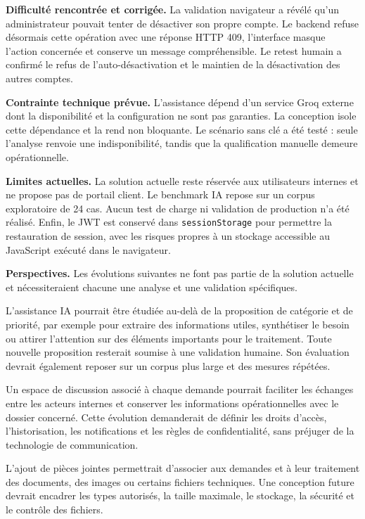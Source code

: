 \textbf{Difficulté rencontrée et corrigée.} La validation navigateur a révélé qu'un administrateur pouvait tenter de désactiver son propre compte. Le backend refuse désormais cette opération avec une réponse HTTP 409, l'interface masque l'action concernée et conserve un message compréhensible. Le retest humain a confirmé le refus de l'auto-désactivation et le maintien de la désactivation des autres comptes.

\textbf{Contrainte technique prévue.} L'assistance dépend d'un service Groq externe dont la disponibilité et la configuration ne sont pas garanties. La conception isole cette dépendance et la rend non bloquante. Le scénario sans clé a été testé : seule l'analyse renvoie une indisponibilité, tandis que la qualification manuelle demeure opérationnelle.

\textbf{Limites actuelles.} La solution actuelle reste réservée aux utilisateurs internes et ne propose pas de portail client. Le benchmark IA repose sur un corpus exploratoire de 24 cas. Aucun test de charge ni validation de production n'a été réalisé. Enfin, le JWT est conservé dans \texttt{sessionStorage} pour permettre la restauration de session, avec les risques propres à un stockage accessible au JavaScript exécuté dans le navigateur.

\textbf{Perspectives.} Les évolutions suivantes ne font pas partie de la solution actuelle et nécessiteraient chacune une analyse et une validation spécifiques.

L'assistance IA pourrait être étudiée au-delà de la proposition de catégorie et de priorité, par exemple pour extraire des informations utiles, synthétiser le besoin ou attirer l'attention sur des éléments importants pour le traitement. Toute nouvelle proposition resterait soumise à une validation humaine. Son évaluation devrait également reposer sur un corpus plus large et des mesures répétées.

Un espace de discussion associé à chaque demande pourrait faciliter les échanges entre les acteurs internes et conserver les informations opérationnelles avec le dossier concerné. Cette évolution demanderait de définir les droits d'accès, l'historisation, les notifications et les règles de confidentialité, sans préjuger de la technologie de communication.

L'ajout de pièces jointes permettrait d'associer aux demandes et à leur traitement des documents, des images ou certains fichiers techniques. Une conception future devrait encadrer les types autorisés, la taille maximale, le stockage, la sécurité et le contrôle des fichiers.

